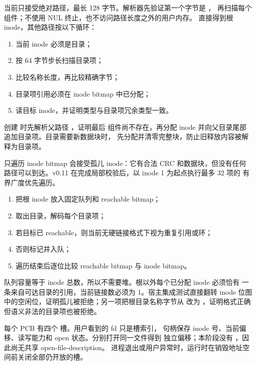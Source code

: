 当前只接受绝对路径，最长 128 字节。解析器先验证第一个字节是 \code{/}，
再扫描每个组件；不使用 NUL 终止，也不访问路径长度之外的用户内存。
\code{/} 直接得到根 inode，其他路径按以下循环：

\begin{enumerate}[label=\arabic*.]
  \item 当前 inode 必须是目录；
  \item 按 64 字节步长扫描目录项；
  \item 比较名称长度，再比较精确字节；
  \item 目录项引用必须在 inode bitmap 中已分配；
  \item 读目标 inode，并证明类型与目录项冗余类型一致。
\end{enumerate}

创建  时先解析父路径 ，证明最后
组件尚不存在，再分配 inode 并向父目录尾部追加目录项。目录需要新数据块时，
先分配并清零完整块，防止旧释放内容被解释为目录项。

只遍历 inode bitmap 会接受孤儿 inode：它有合法 CRC 和数据块，但没有任何
路径可以到达。v0.11 在完成局部校验后，以 inode 1 为起点执行最多 32 项的
有界广度优先遍历。

\begin{enumerate}[label=\arabic*.]
  \item 把根 inode 放入固定队列和 reachable bitmap；
  \item 取出目录，解码每个目录项；
  \item 若目标已 reachable，则当前无硬链接格式下视为重复引用或环；
  \item 否则标记并入队；
  \item 遍历结束后逐位比较 reachable bitmap 与 inode bitmap。
\end{enumerate}

队列容量等于 inode 总数，所以不需要堆。根以外每个已分配 inode 必须恰有
一条来自可达目录的引用，当前链接数必须为 1。宿主集成测试直接翻转 inode
位图中的空闲位，证明孤儿被拒绝；另一项把根目录名称字节从  改为
，证明格式正确但语义非法的目录项也被拒绝。

每个 PCB 有四个  槽。用户看到的 fd 只是槽索引，
句柄保存 inode 号、当前偏移、读写能力和 open 状态。分别打开同一文件得到
独立偏移；本阶段没有 ，因此尚无共享 open-file-description。
进程退出或用户异常时，运行时在销毁地址空间前关闭全部仍开放的槽。

